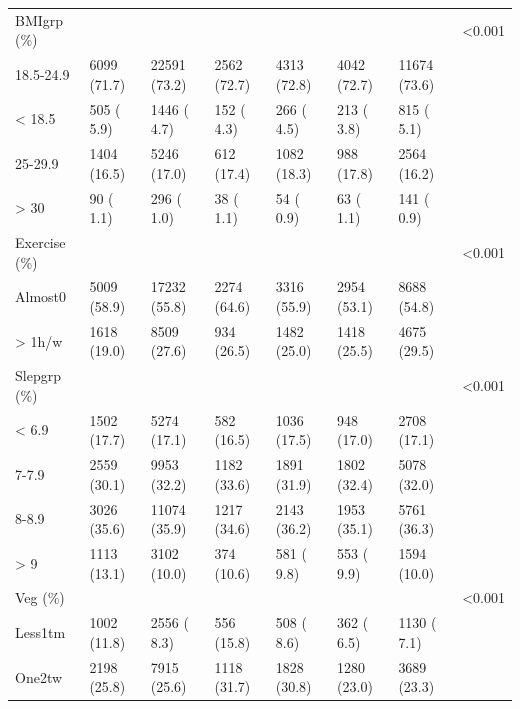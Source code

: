 \documentclass[]{tufte-handout}
\begin{document}
\begin{table}[!htbp]
\begin{tabular}[t]{llllllll}
\rowcolor{gray!6}  BMIgrp (\%) &  &  &  &  &  &  & <0.001\\
\hspace{1em}18.5-24.9 & 6099 (71.7) & 22591 (73.2) & 2562 (72.7) & 4313 (72.8) & 4042 (72.7) & 11674 (73.6) & \\
\rowcolor{gray!6}  \hspace{1em}< 18.5 & 505 ( 5.9) & 1446 ( 4.7) & 152 ( 4.3) & 266 ( 4.5) & 213 ( 3.8) & 815 ( 5.1) & \\
\hspace{1em}25-29.9 & 1404 (16.5) & 5246 (17.0) & 612 (17.4) & 1082 (18.3) & 988 (17.8) & 2564 (16.2) & \\
\rowcolor{gray!6}  \hspace{1em}> 30 & 90 ( 1.1) & 296 ( 1.0) & 38 ( 1.1) & 54 ( 0.9) & 63 ( 1.1) & 141 ( 0.9) & \\
Exercise (\%) &  &  &  &  &  &  & <0.001\\
\rowcolor{gray!6}  \hspace{1em}Almost0 & 5009 (58.9) & 17232 (55.8) & 2274 (64.6) & 3316 (55.9) & 2954 (53.1) & 8688 (54.8) & \\
\hspace{1em}> 1h/w & 1618 (19.0) & 8509 (27.6) & 934 (26.5) & 1482 (25.0) & 1418 (25.5) & 4675 (29.5) & \\
\rowcolor{gray!6}  Slepgrp (\%) &  &  &  &  &  &  & <0.001\\
\hspace{1em}< 6.9 & 1502 (17.7) & 5274 (17.1) & 582 (16.5) & 1036 (17.5) & 948 (17.0) & 2708 (17.1) & \\
\rowcolor{gray!6}  \hspace{1em}7-7.9 & 2559 (30.1) & 9953 (32.2) & 1182 (33.6) & 1891 (31.9) & 1802 (32.4) & 5078 (32.0) & \\
\hspace{1em}8-8.9 & 3026 (35.6) & 11074 (35.9) & 1217 (34.6) & 2143 (36.2) & 1953 (35.1) & 5761 (36.3) & \\
\rowcolor{gray!6}  \hspace{1em}> 9 & 1113 (13.1) & 3102 (10.0) & 374 (10.6) & 581 ( 9.8) & 553 ( 9.9) & 1594 (10.0) & \\
Veg (\%) &  &  &  &  &  &  & <0.001\\
\rowcolor{gray!6}  \hspace{1em}Less1tm & 1002 (11.8) & 2556 ( 8.3) & 556 (15.8) & 508 ( 8.6) & 362 ( 6.5) & 1130 ( 7.1) & \\
\hspace{1em}One2tw & 2198 (25.8) & 7915 (25.6) & 1118 (31.7) & 1828 (30.8) & 1280 (23.0) & 3689 (23.3) & \\

\end{tabular}
\end{table}
\end{document}
